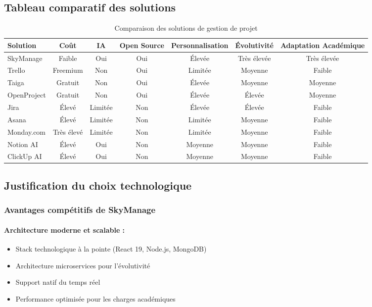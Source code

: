 \subsection{Tableau comparatif des solutions}

\begin{table}[h!]
\centering
\caption{Comparaison des solutions de gestion de projet}
\label{tab:comparative-solutions}
\begin{tabular}{|l|c|c|c|c|c|c|}
\hline
\textbf{Solution} & \textbf{Coût} & \textbf{IA} & \textbf{Open Source} & \textbf{Personnalisation} & \textbf{Évolutivité} & \textbf{Adaptation Académique} \\
\hline
SkyManage & Faible & Oui & Oui & Élevée & Très élevée & Très élevée \\
\hline
Trello & Freemium & Non & Oui & Limitée & Moyenne & Faible \\
\hline
Taiga & Gratuit & Non & Oui & Élevée & Moyenne & Moyenne \\
\hline
OpenProject & Gratuit & Non & Oui & Élevée & Élevée & Moyenne \\
\hline
Jira & Élevé & Limitée & Non & Élevée & Élevée & Faible \\
\hline
Asana & Élevé & Limitée & Non & Limitée & Moyenne & Faible \\
\hline
Monday.com & Très élevé & Limitée & Non & Limitée & Moyenne & Faible \\
\hline
Notion AI & Élevé & Oui & Non & Moyenne & Moyenne & Faible \\
\hline
ClickUp AI & Élevé & Oui & Non & Moyenne & Moyenne & Faible \\
\hline
\end{tabular}
\end{table}

\subsection{Justification du choix technologique}

\subsubsection{Avantages compétitifs de SkyManage}

\paragraph{Architecture moderne et scalable :}
\begin{itemize}
    \item Stack technologique à la pointe (React 19, Node.js, MongoDB)
    \item Architecture microservices pour l'évolutivité
    \item Support natif du temps réel
    \item Performance optimisée pour les charges académiques
\end{itemize}

